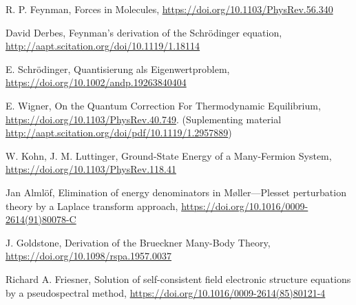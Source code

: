 \item
  R. P. Feynman,
  Forces in Molecules,
  \url{https://doi.org/10.1103/PhysRev.56.340}

\item
  David Derbes,
  Feynman’s derivation of the Schrödinger equation,
  \url{http://aapt.scitation.org/doi/10.1119/1.18114}

\item
  E. Schrödinger,
  Quantisierung als Eigenwertproblem,
  \url{https://doi.org/10.1002/andp.19263840404}

\item
  E. Wigner,
  On the Quantum Correction For Thermodynamic Equilibrium,
  \url{https://doi.org/10.1103/PhysRev.40.749}.
  (Suplementing material \url{http://aapt.scitation.org/doi/pdf/10.1119/1.2957889})

\item
  W. Kohn, J. M. Luttinger,
  Ground-State Energy of a Many-Fermion System,
  \url{https://doi.org/10.1103/PhysRev.118.41}

\item
  Jan Almlöf,
  Elimination of energy denominators in Møller—Plesset perturbation theory by a Laplace transform approach,
  \url{https://doi.org/10.1016/0009-2614(91)80078-C}

\item
  J. Goldstone,
  Derivation of the Brueckner Many-Body Theory,
  \url{https://doi.org/10.1098/rspa.1957.0037}

\item
  Richard A. Friesner,
  Solution of self-consistent field electronic structure equations by a pseudospectral method,
  \url{https://doi.org/10.1016/0009-2614(85)80121-4}

